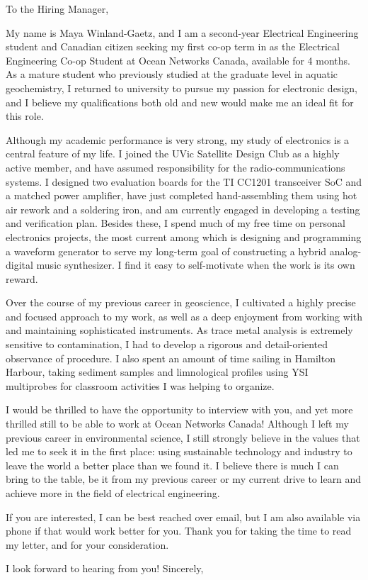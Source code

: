 \documentclass{letter}
\begin{document}
\begin{letter}{}
\opening{To the Hiring Manager,}

My name is Maya Winland-Gaetz, and I am a second-year Electrical Engineering student and Canadian citizen seeking my first co-op term in as the Electrical Engineering Co-op Student at Ocean Networks Canada, available for 4 months. As a mature student who previously studied at the graduate level in aquatic geochemistry, I returned to university to pursue my passion for electronic design, and I believe my qualifications both old and new would make me an ideal fit for this role.

Although my academic performance is very strong, my study of electronics is a central feature of my life. I joined the UVic Satellite Design Club as a highly active member, and have assumed responsibility for the radio-communications systems. I designed two evaluation boards for the TI CC1201 transceiver SoC and a matched power amplifier, have just completed hand-assembling them using hot air rework and a soldering iron, and am currently engaged in developing a testing and verification plan. Besides these, I spend much of my free time on personal electronics projects, the most current among which is designing and programming a waveform generator to serve my long-term goal of constructing a hybrid analog-digital music synthesizer. I find it easy to self-motivate when the work is its own reward.

Over the course of my previous career in geoscience, I cultivated a highly precise and focused approach to my work, as well as a deep enjoyment from working with and maintaining sophisticated instruments. As trace metal analysis is extremely sensitive to contamination, I had to develop a rigorous and detail-oriented observance of procedure. I also spent an amount of time sailing in Hamilton Harbour, taking sediment samples and limnological profiles using YSI multiprobes for classroom activities I was helping to organize. 

I would be thrilled to have the opportunity to interview with you, and yet more thrilled still to be able to work at Ocean Networks Canada! Although I left my previous career in environmental science, I still strongly believe in the values that led me to seek it in the first place: using sustainable technology and industry to leave the world a better place than we found it. I believe there is much I can bring to the table, be it from my previous career or my current drive to learn and achieve more in the field of electrical engineering.

If you are interested, I can be best reached over email, but I am also available via phone if that would work better for you. Thank you for taking the time to read my letter, and for your consideration.

\closing{I look forward to hearing from you! Sincerely,}
\end{letter}
\end{document}
